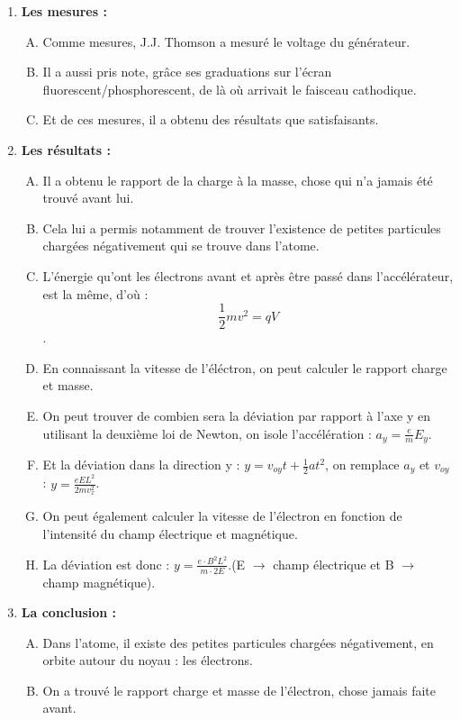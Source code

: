 \documentclass[../main.tex]{subfiles}
\begin{document}
\begin{enumerate}[I]
\begin{enumerate}[A. ]
    \end{enumerate}
    \item \textbf{Les mesures :}
    \begin{enumerate}[A. ]
        \item Comme mesures, J.J. Thomson a mesuré le voltage du générateur.
        \item Il a aussi pris note, grâce ses graduations sur l'écran fluorescent/phosphorescent, de là où arrivait le faisceau cathodique.
        \item Et de ces mesures, il a obtenu des résultats que satisfaisants.
    \end{enumerate}
    \item \textbf {Les résultats :}
    \begin{enumerate}[A. ]
        \item Il a obtenu le rapport de la charge à la masse, chose qui n'a jamais été trouvé avant lui.
        \item Cela lui a permis notamment de trouver l'existence de petites particules chargées négativement qui se trouve dans l'atome. 
        \item L'énergie qu'ont les électrons avant et après être passé dans l'accélérateur, est la même, d'où : $$\frac{1}{2}mv^2 = qV$$.
        \item En connaissant la vitesse de l'éléctron, on peut calculer le rapport charge et masse.
        \item On peut trouver de combien sera la déviation par rapport à l'axe y en utilisant la deuxième loi de Newton, on isole l'accélération : $a_y = \frac{e}{m}E_y$.
        \item Et la déviation dans la direction y : $y = v_{oy}t + \frac{1}{2}at^2$, on remplace $a_y$ et $v_{oy}$ : $y = \frac{eEL^2}{2mv_x^2}$.
        \item On peut également calculer la vitesse de l'électron en fonction de l'intensité du champ électrique et magnétique.
        \item La déviation est donc : $y = \frac{e \cdot B^2L^2}{m \cdot 2E}$.(E $\rightarrow$ champ électrique et B $\rightarrow$ champ magnétique).
    \end{enumerate}
    \item \textbf {La conclusion :}
    \begin{enumerate}[A. ]
        \item Dans l'atome, il existe des petites particules chargées négativement, en orbite autour du noyau : les électrons.
        \item On a trouvé le rapport charge et masse de l'électron, chose jamais faite avant.

\end{enumerate}
\end{enumerate}
\end{document}
